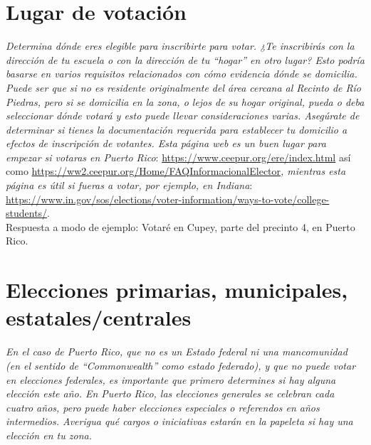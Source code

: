 \documentclass[11pt]{article} %
\begin{document}
\section{Lugar de votación}
\textit{Determina dónde eres elegible para inscribirte para votar. ¿Te inscribirás con la dirección de tu escuela o con la dirección de tu ``hogar'' en otro lugar? Esto podría basarse en varios requisitos relacionados con cómo evidencia dónde se domicilia. Puede ser que si no es residente originalmente del área cercana al Recinto de Río Piedras, pero si se domicilia en la zona, o lejos de su hogar original, pueda o deba seleccionar dónde votará y esto puede llevar consideraciones varias. Asegúrate de determinar si tienes la documentación requerida para establecer tu domicilio a efectos de inscripción de votantes. Esta página web es un buen lugar para empezar si votaras en Puerto Rico}: \url{https://www.ceepur.org/ere/index.html} así como \url{https://ww2.ceepur.org/Home/FAQInformacionalElector}\textit{, mientras esta página es útil si fueras a votar, por ejemplo, en Indiana}: \url{https://www.in.gov/sos/elections/voter-information/ways-to-vote/college-students/}.
\\
Respuesta a modo de ejemplo: Votaré en Cupey, parte del precinto 4, en Puerto Rico. 

\section{Elecciones primarias, municipales, estatales/centrales}

\textit{En el caso de Puerto Rico, que no es un Estado federal ni una mancomunidad (en el sentido de ``Commonwealth'' como estado federado), y que no puede votar en elecciones federales, es importante que primero determines si hay alguna elección este año. En Puerto Rico, las elecciones generales se celebran cada cuatro años, pero puede haber elecciones especiales o referendos en años intermedios. Averigua qué cargos o iniciativas estarán en la papeleta si hay una elección en tu zona.}
\end{document}
